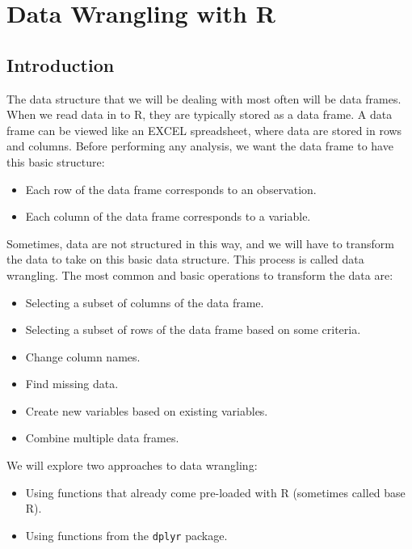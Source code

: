 \documentclass[
]{book}
\providecommand{\tightlist}{%
  \setlength{\itemsep}{0pt}\setlength{\parskip}{0pt}}
\begin{document}
\hypertarget{wrangling}{%
\chapter{Data Wrangling with R}\label{wrangling}}

\hypertarget{introduction}{%
\section{Introduction}\label{introduction}}

The data structure that we will be dealing with most often will be data frames. When we read data in to R, they are typically stored as a data frame. A data frame can be viewed like an EXCEL spreadsheet, where data are stored in rows and columns. Before performing any analysis, we want the data frame to have this basic structure:

\begin{itemize}
\tightlist
\item
  Each row of the data frame corresponds to an observation.
\item
  Each column of the data frame corresponds to a variable.
\end{itemize}

Sometimes, data are not structured in this way, and we will have to transform the data to take on this basic data structure. This process is called data wrangling. The most common and basic operations to transform the data are:

\begin{itemize}
\tightlist
\item
  Selecting a subset of columns of the data frame.
\item
  Selecting a subset of rows of the data frame based on some criteria.
\item
  Change column names.
\item
  Find missing data.
\item
  Create new variables based on existing variables.
\item
  Combine multiple data frames.
\end{itemize}

We will explore two approaches to data wrangling:

\begin{itemize}
\tightlist
\item
  Using functions that already come pre-loaded with R (sometimes called base R).
\item
  Using functions from the \texttt{dplyr} package.
\end{itemize}
\end{document}
